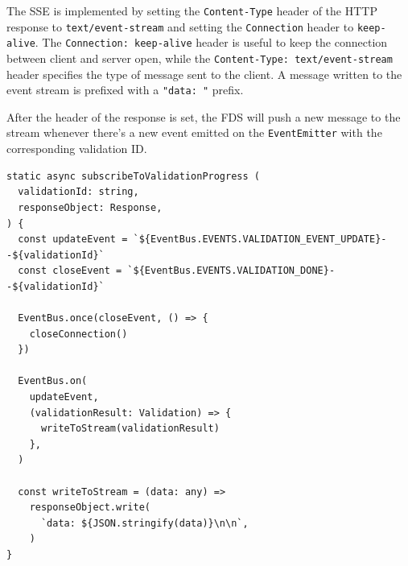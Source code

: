     The SSE is implemented by setting the \verb;Content-Type; header of the HTTP response to \verb;text/event-stream; and setting the \verb;Connection; header to \verb;keep-alive;. The \verb;Connection: keep-alive; header is useful to keep the connection between client and server open, while the \verb;Content-Type: text/event-stream; header specifies the type of message sent to the client. A message written to the event stream is prefixed with a \verb;"data: "; prefix. 

    After the header of the response is set, the FDS will push a new message to the stream whenever there's a new event emitted on the \verb;EventEmitter; with the corresponding validation ID. 

    \begin{lstlisting}[style=es6, caption={Writing to SSE stream when certain events are published (TypeScript)}]
static async subscribeToValidationProgress (
  validationId: string,
  responseObject: Response,
) {
  const updateEvent = `${EventBus.EVENTS.VALIDATION_EVENT_UPDATE}--${validationId}`
  const closeEvent = `${EventBus.EVENTS.VALIDATION_DONE}--${validationId}`

  EventBus.once(closeEvent, () => {
    closeConnection()
  })

  EventBus.on(
    updateEvent,
    (validationResult: Validation) => {
      writeToStream(validationResult)
    },
  )

  const writeToStream = (data: any) =>
    responseObject.write(
      `data: ${JSON.stringify(data)}\n\n`,
    )
}
    \end{lstlisting}

